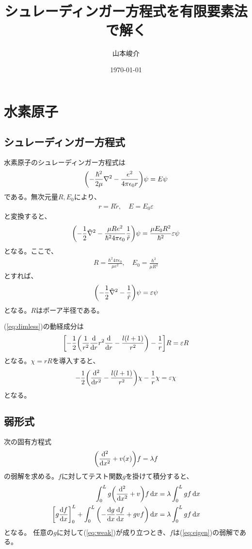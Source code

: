 \documentclass[xelatex,ja=standard]{bxjsarticle}
\title{シュレーディンガー方程式を有限要素法で解く}
\author{山本峻介}
\date{\today}
\begin{document}
\maketitle

\section{水素原子}
\subsection{シュレーディンガー方程式}
水素原子のシュレーディンガー方程式は
\begin{align}
    \qty(-\frac{\hbar^2}{2\mu}\nabla^2 -\frac{e^2}{4\pi\epsilon_0 r})\psi = E\psi
\end{align}
である。無次元量$R, E_0$により、
\begin{align}
    r = R\tilde{r},\quad E = E_0\varepsilon
\end{align}
と変換すると、
\begin{align}
    \qty(-\frac{1}{2}\tilde\nabla^2 - \frac{\mu R e^2}{\hbar^2 4\pi\epsilon_0}\frac{1}{\tilde r})\psi = \frac{\mu E_0R^2}{\hbar^2}\varepsilon\psi
\end{align}
となる。ここで、
\begin{align}
    R = \frac{\hbar^2 4\pi\epsilon_0}{\mu e^2}, \quad E_0 = \frac{\hbar^2}{\mu R^2}
\end{align}
とすれば、
\begin{align}
    \qty(-\frac{1}{2}\tilde\nabla^2 - \frac{1}{\tilde r})\psi = \varepsilon\psi\label{eq:dimless}
\end{align}
となる。$R$はボーア半径である。

(\ref{eq:dimless})の動経成分は
\begin{align}
    \qty[-\frac{1}{2}\qty(\frac{1}{r^2}\dv{r}r^2\dv{r} - \frac{l(l+1)}{r^2})
     - \frac{1}{r}]R = \varepsilon R
\end{align}
となる。$\chi = rR$を導入すると、
\begin{align}
    -\frac{1}{2}\qty(\dv[2]{r} - \frac{l(l+1)}{r^2})\chi - \frac{1}{r}\chi = \varepsilon\chi
\end{align}
となる。 

\subsection{弱形式}
次の固有方程式
\begin{align}
    \qty(\dv[2]{x} + v(x))f = \lambda f\label{eq:eigen}
\end{align}
の弱解を求める。$f$に対してテスト関数$g$を掛けて積分すると、
\begin{align}
    \int_0^Lg\qty(\dv[2]{x} + v)f\dd{x} &= \lambda\int_0^Lgf\dd{x}\notag\\
    \qty[g\dv{f}{x}]_0^L+\int_0^L\qty(-\dv{g}{x}\dv{f}{x} + gvf)\dd{x}
     &= \lambda\int_0^Lgf\dd{x}\label{eq:weak}
\end{align}
となる。  任意の$g$に対して(\ref{eq:weak})が成り立つとき、$f$は(\ref{eq:eigen})の弱解である。
\end{document}
